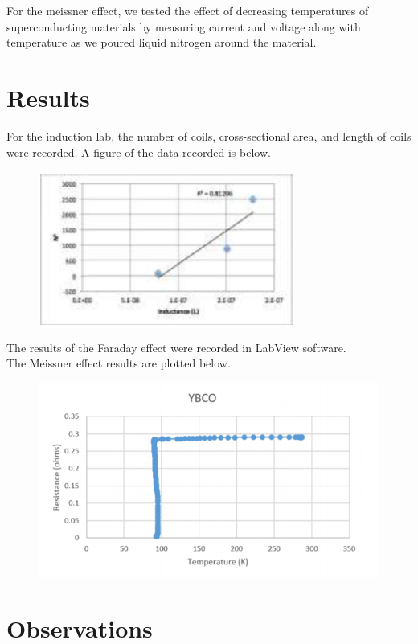 \documentclass{article}
\begin{document}
For the meissner effect, we tested the effect of decreasing temperatures of superconducting materials by measuring current and voltage along with temperature as we poured liquid nitrogen around the material.\\

\section{Results}

For the induction lab, the number of coils, cross-sectional area, and length of coils were recorded. A figure of the data recorded is below.

\begin{figure}[h!]
\centering
\includegraphics[scale=0.9]{inductance.png}
\end{figure}

The results of the Faraday effect were recorded in LabView software.\\

The Meissner effect results are plotted below.

\begin{figure}[h!]
\centering
\includegraphics[scale=0.5]{meissner.png}
\end{figure}

\section{Observations}
\end{document}
